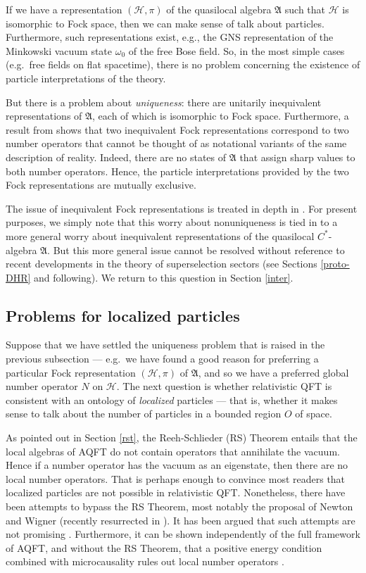 \documentclass[11pt]{article}
\newcommand{\alg}[1]{\mathfrak{#1}}
\theoremstyle{definition}
\theoremstyle{definition}
\theoremstyle{remark}
\def\2#1{{\mathcal #1}}
\def\al#1{{\mathfrak #1}}
\def\om{\omega} \def\Om{\Omega} \def\dd{\partial} \def\D{\Delta}
\begin{document}
If we have a representation $(\2H ,\pi )$ of the quasilocal algebra
$\alg{A}$ such that $\2H$ is isomorphic to Fock space, then we can
make sense of talk about particles.  Furthermore, such representations
exist, e.g., the GNS representation of the Minkowski vacuum state $\om
_0$ of the free Bose field.  So, in the most simple cases (e.g.\ free
fields on flat spacetime), there is no problem concerning the
existence of particle interpretations of the theory.

But there is a problem about \emph{uniqueness}: there are unitarily
inequivalent representations of $\al A$, each of which is isomorphic
to Fock space.  Furthermore, a result from \cite{cha2,cha1} shows that
two inequivalent Fock representations correspond to two number
operators that cannot be thought of as notational variants of the same
description of reality.  Indeed, there are no states of $\al A$ that
assign sharp values to both number operators.  Hence, the particle
interpretations provided by the two Fock representations are mutually
exclusive.

The issue of inequivalent Fock representations is treated in depth in
\cite{rindler}.  For present purposes, we simply note that this worry
about nonuniqueness is tied in to a more general worry about
inequivalent representations of the quasilocal $C^*$-algebra
$\alg{A}$.  But this more general issue cannot be resolved without
reference to recent developments in the theory of superselection
sectors (see Sections \ref{proto-DHR} and following).  We return to
this question in Section \ref{inter}.

\subsection{Problems for localized particles}

Suppose that we have settled the uniqueness problem that is raised in
the previous subsection --- e.g.\ we have found a good reason for
preferring a particular Fock representation $(\2H, \pi )$ of $\al A$,
and so we have a preferred global number operator $N$ on $\2H$.  The
next question is whether relativistic QFT is consistent with an
ontology of \emph{localized} particles --- that is, whether it makes
sense to talk about the number of particles in a bounded region $O$ of
space.

As pointed out in Section \ref{rst}, the Reeh-Schlieder
(RS) Theorem entails that the local algebras of AQFT do
not contain operators that annihilate the vacuum.
Hence if a number operator has the vacuum as an
eigenstate, then there are no local number operators.
That is perhaps enough to convince most readers that
localized particles are not possible in relativistic
QFT.  Nonetheless, there have been attempts to bypass
the RS Theorem, most notably the proposal of Newton and
Wigner (recently resurrected in \cite{flem}).  It has
been argued that such attempts are not promising
\cite{me}.  Furthermore, it can be shown independently
of the full framework of AQFT, and without the RS
Theorem, that a positive energy condition combined with
microcausality rules out local number operators
\cite{noplace}.
\end{document}
